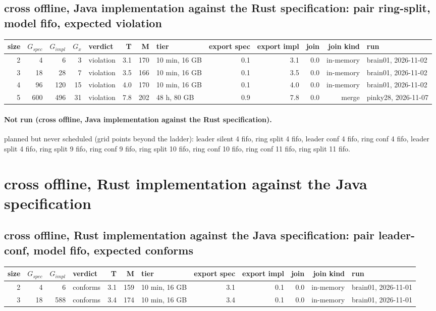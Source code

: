 \documentclass[10pt]{article}
\begin{document}
\subsection*{cross offline, Java implementation against the Rust specification: pair \textsf{ring-split}, model fifo, expected violation}
\begin{longtable}{@{}rrrrlrrlrrrrl@{}}
\toprule
size & $G_{\mathit{spec}}$ & $G_{\mathit{impl}}$ & $G_x$ & verdict & T & M & tier & export spec & export impl & join & join kind & run \\
\midrule
\endhead
\color{red} 2 & 4 & 6 & 3 & violation & 3.1 & 170 & 10 min, 16 GB & 0.1 & 3.1 & 0.0 & in-memory & brain01, 2026-11-02 \\
\color{red} 3 & 18 & 28 & 7 & violation & 3.5 & 166 & 10 min, 16 GB & 0.1 & 3.5 & 0.0 & in-memory & brain01, 2026-11-02 \\
\color{red} 4 & 96 & 120 & 15 & violation & 4.0 & 170 & 10 min, 16 GB & 0.1 & 4.0 & 0.0 & in-memory & brain01, 2026-11-02 \\
\color{red} 5 & 600 & 496 & 31 & violation & 7.8 & 202 & 48 h, 80 GB & 0.9 & 7.8 & 0.0 & merge & pinky28, 2026-11-07 \\
\bottomrule
\end{longtable}
\paragraph{Not run (cross offline, Java implementation against the Rust specification).}
planned but never scheduled (grid points beyond the ladder): leader silent 4 fifo, ring split 4 fifo, leader conf 4 fifo, ring conf 4 fifo, leader split 4 fifo, ring split 9 fifo, ring conf 9 fifo, ring split 10 fifo, ring conf 10 fifo, ring conf 11 fifo, ring split 11 fifo.\par
\section*{cross offline, Rust implementation against the Java specification}
\subsection*{cross offline, Rust implementation against the Java specification: pair \textsf{leader-conf}, model fifo, expected conforms}
\begin{longtable}{@{}rrrlrrlrrrrl@{}}
\toprule
size & $G_{\mathit{spec}}$ & $G_{\mathit{impl}}$ & verdict & T & M & tier & export spec & export impl & join & join kind & run \\
\midrule
\endhead
\color{red} 2 & 4 & 6 & conforms & 3.1 & 159 & 10 min, 16 GB & 3.1 & 0.1 & 0.0 & in-memory & brain01, 2026-11-01 \\
\color{red} 3 & 18 & 588 & conforms & 3.4 & 174 & 10 min, 16 GB & 3.4 & 0.1 & 0.0 & in-memory & brain01, 2026-11-01 \\
\bottomrule
\end{longtable}
\end{document}
